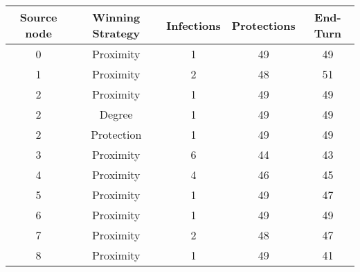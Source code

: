\documentclass[results.tex]{subfiles}
\begin{document}
    \begin{center}
        \begin{tabular}{| c || c | c | c | c |}
            \hline
            {\bfseries Source node} & {\bfseries Winning Strategy} & {\bfseries Infections} & {\bfseries Protections}
            & {\bfseries End-Turn}
            \\  %
            \hline\hline
            0                       & Proximity                    & 1                      & 49                      & 49                   \\
            \hline
            1                       & Proximity                    & 2                      & 48                      & 51                   \\
            \hline
            2                       & Proximity                    & 1                      & 49                      & 49                   \\
            \hline
            2                       & Degree                       & 1                      & 49                      & 49                   \\
            \hline
            2                       & Protection                   & 1                      & 49                      & 49                   \\
            \hline
            3                       & Proximity                    & 6                      & 44                      & 43                   \\
            \hline
            4                       & Proximity                    & 4                      & 46                      & 45                   \\
            \hline
            5                       & Proximity                    & 1                      & 49                      & 47                   \\
            \hline
            6                       & Proximity                    & 1                      & 49                      & 49                   \\
            \hline
            7                       & Proximity                    & 2                      & 48                      & 47                   \\
            \hline
            8                       & Proximity                    & 1                      & 49                      & 41                   \\

\end{tabular}
\end{center}
\end{document}
